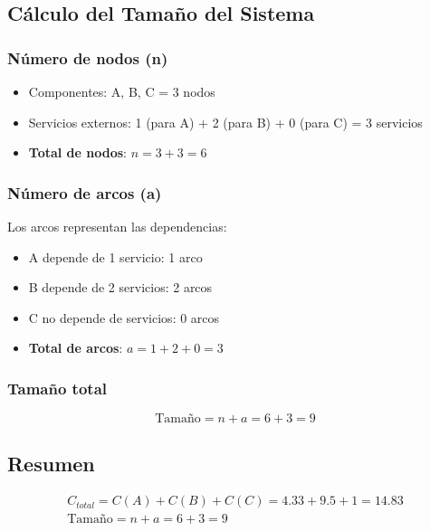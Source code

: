\subsection{Cálculo del Tamaño del Sistema}\label{subsec:calculo-del-tamano-del-sistema}

\subsubsection{Número de nodos (n)}
\begin{itemize}
    \item Componentes: A, B, C = 3 nodos
    \item Servicios externos: 1 (para A) + 2 (para B) + 0 (para C) = 3 servicios
    \item \textbf{Total de nodos}: $n = 3 + 3 = 6$
\end{itemize}

\subsubsection{Número de arcos (a)}
Los arcos representan las dependencias:
\begin{itemize}
    \item A depende de 1 servicio: 1 arco
    \item B depende de 2 servicios: 2 arcos
    \item C no depende de servicios: 0 arcos
    \item \textbf{Total de arcos}: $a = 1 + 2 + 0 = 3$
\end{itemize}

\subsubsection{Tamaño total}
\[\text{Tamaño} = n + a = 6 + 3 = \boxed{9}\]



\begin{solucion}
    \subsection{Resumen}\label{subsec:resumen}
    \begin{gather*}
        C_{total} = C(A) + C(B) + C(C) = 4.33 + 9.5 + 1 = 14.83\\
        \text{Tamaño} = n + a = 6 + 3 = \boxed{9}\\
    \end{gather*}
\end{solucion}


